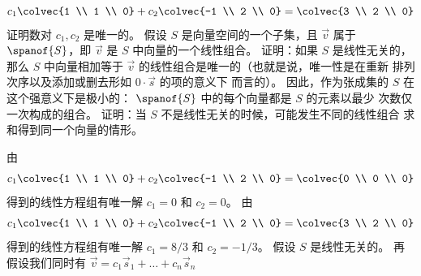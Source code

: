 \begin{exercises}
\begin{exparts}
        \begin{equation*}
          c_1\colvec{1 \\ 1 \\ 0}
          +c_2\colvec{-1 \\ 2 \\ 0}
          =\colvec{3 \\ 2 \\ 0}
        \end{equation*}
        证明数对 \( c_1,c_2 \) 是唯一的。
      \partsitem 假设 \( S \) 是向量空间的一个子集，且
        \( \vec{v} \) 属于 \( \spanof{S} \)，即 \( \vec{v} \) 是
        $S$ 中向量的一个线性组合。
        证明：如果 \( S \) 是线性无关的，那么 $S$ 中向量相加等于
        \( \vec{v} \) 的线性组合是唯一的（也就是说，唯一性是在重新
        排列次序以及添加或删去形如 \( 0\cdot\vec{s} \) 的项的意义下
        而言的）。
        因此，作为张成集的 \( S \) 在这个强意义下是极小的：
        \( \spanof{S} \) 中的每个向量都是 $S$ 的元素以最少
        次数\Dash 仅一次\Dash 构成的组合。
      \partsitem
        证明：当 \( S \) 不是线性无关的时候，可能发生不同的线性组合
        求和得到同一个向量的情形。
    \end{exparts}
    \begin{answer}
      \begin{exparts}
        \partsitem 由
          \begin{equation*}
            c_1\colvec{1 \\ 1 \\ 0}
            +c_2\colvec{-1 \\ 2 \\ 0}
            =\colvec{0 \\ 0 \\ 0}
          \end{equation*}
          得到的线性方程组有唯一解 \( c_1=0 \) 和 \( c_2=0 \)。
        \partsitem 由
          \begin{equation*}
            c_1\colvec{1 \\ 1 \\ 0}
            +c_2\colvec{-1 \\ 2 \\ 0}
            =\colvec{3 \\ 2 \\ 0}
          \end{equation*}
          得到的线性方程组有唯一解 \( c_1=8/3 \) 和 \( c_2=-1/3 \)。
        \partsitem 假设 \( S \) 是线性无关的。
          再假设我们同时有 $\vec{v}=c_1\vec{s}_1+\dots+c_n\vec{s}_n$

\end{exparts}
\end{answer}
\end{exercises}
